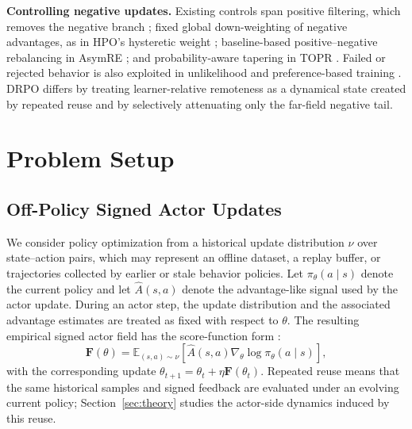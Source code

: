 \documentclass[sigconf,anonymous,review]{acmart}
\theoremstyle{acmdefinition}
\begin{document}
\textbf{Controlling negative updates.}
Existing controls span positive filtering, which removes the negative branch
\citep{peng2019advantage,nair2020awac,kostrikov2021offline}; fixed global
down-weighting of negative advantages, as in HPO's hysteretic weight
\citep{sana2026hpo}; baseline-based positive--negative rebalancing in
AsymRE \citep{arnal2025asymmetric}; and probability-aware tapering in TOPR
\citep{leroux2025tapered}. Failed or rejected behavior is also exploited in
unlikelihood and preference-based training
\citep{welleck2019neural,rafailov2023direct,ethayarajh2024kto,
duan2024negating,zhang2024negative,zhu2025negative,song2025good}.
DRPO differs by treating learner-relative remoteness as a dynamical state
created by repeated reuse and by selectively attenuating only the far-field
negative tail.

\section{Problem Setup}
\label{sec:problem_setup}


\subsection{Off-Policy Signed Actor Updates}

We consider policy optimization from a historical update distribution
$\nu$ over state--action pairs, which may represent an offline dataset,
a replay buffer, or trajectories collected by earlier or stale behavior
policies. Let $\pi_\theta(a \mid s)$ denote the current policy and let
$\widehat{A}(s,a)$ denote the advantage-like signal used by the actor
update. During an actor step, the update distribution and the associated
advantage estimates are treated as fixed with respect to $\theta$. The resulting empirical signed actor field has the score-function form
\citep{williams1992simple,sutton2000policy}:
\begin{equation}
    \mathbf{F}(\theta)
    =
    \mathbb{E}_{(s,a)\sim\nu}
    \left[
        \widehat{A}(s,a)
        \nabla_\theta \log \pi_\theta(a \mid s)
    \right],
    \label{eq:empirical_actor_field}
\end{equation}
with the corresponding update
\(\theta_{t+1}=\theta_t+\eta\mathbf{F}(\theta_t)\).
Repeated reuse means that the same historical samples and signed feedback
are evaluated under an evolving current policy;
Section~\ref{sec:theory} studies the actor-side dynamics induced by this
reuse.
\end{document}
